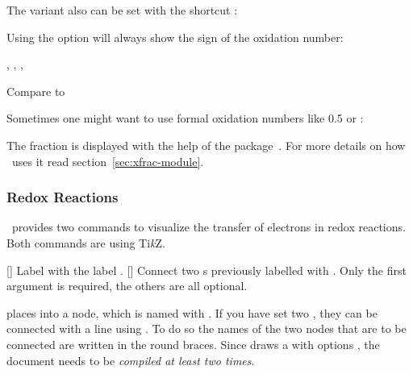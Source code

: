 \documentclass{chemmacros-manual}
\makeatletter
\newcommand*\TikZ{Ti\textit{k}Z}
\renewenvironment{commands}
  {%
    \let\command\cnltx@command
    \let\explcommand\cnltx@explcommand
    \cnltxlist
  }
  {\endcnltxlist}
\makeatother
\begin{document}
The  variant also can be set with the shortcut \sarg:
\begin{example}
   
\end{example}

Using the  option will always show the sign of the
oxidation number:
\begin{example}
  , , , 
\end{example}

\begin{example}
  Compare  to 
\end{example}

Sometimes one might want to use formal oxidation numbers like \num{.5} or
:
\begin{example}

\end{example}

The fraction is displayed with the help of the 
package~\cite{bnd:l3packages}.  For more details on how \chemmacros\ uses it
read section~\vref{sec:xfrac-module}.

\subsubsection{Redox Reactions}\label{sec:redox-reactions}

\chemmacros\ provides two commands to visualize the transfer of electrons in
redox reactions.  Both commands are using \TikZ.
\begin{commands}
  \command{OX}[]
    Label  with the label .
  \command{redox}[]
    Connect two s previously labelled with .  Only the first
    argument  is required, the others are all
    optional.
\end{commands}

 places  into a node, which is named with .  If
you have set two , they can be connected with a line using .
To do so the names of the two nodes that are to be connected are written in
the round braces.  Since  draws a  with options
, the document needs to be \emph{compiled at
  least two times}.
\end{document}
